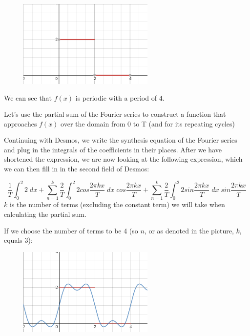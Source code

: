 \documentclass[a4paper]{article}
\begin{document}
	\begin{figure}[H]
		\centering
		\includegraphics[width=0.6\textwidth]{baseGraph.png}
	\end{figure}
	
	We can see that $f(x)$ is periodic with a period of 4.
	
	Let's use the partial sum of the Fourier series to construct a function that approaches $f(x)$ over the domain from 0 to T (and for its repeating cycles)
	
	Continuing with Desmos, we write the synthesis equation of the Fourier series and plug in the integrals of the coefficients in their places. After we have shortened the expression, we are now looking at the following expression, which we can then fill in in the second field of Desmos:
	
	\begin{equation*}
	\frac{1}{T}\int_{0}^{2}2\;dx + \sum\limits_{n=1}^k \frac{2}{T}\int_{0}^{2}2cos\frac{2\pi kx}{T}\;dx\;cos\frac{2\pi kx}{T} + \sum\limits_{n=1}^k \frac{2}{T}\int_{0}^{2}2sin\frac{2\pi kx}{T}\;dx\;sin\frac{2\pi kx}{T} 
	\end{equation*}
	$k$ is the number of terms (excluding the constant term) we will take when calculating the partial sum.
	
	If we choose the number of terms to be 4 (so $n$, or as denoted in the picture, $k$, equals $3$):
	
	\begin{figure}[H]
		\centering
		\includegraphics[width=0.6\textwidth]{k=3.png}
	\end{figure}
	
\end{document}
